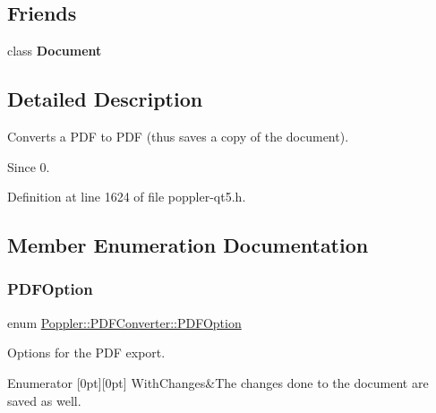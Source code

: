 \subsection*{Friends}
\begin{DoxyCompactItemize}
\item 
\mbox{\label{class_poppler_1_1_p_d_f_converter_a883538034e58fc5c0de7d4e4cab3cef7}} 
class {\bfseries Document}
\end{DoxyCompactItemize}


\subsection{Detailed Description}
Converts a P\+DF to P\+DF (thus saves a copy of the document).

\begin{DoxySince}{Since}
0. 
\end{DoxySince}


Definition at line 1624 of file poppler-\/qt5.\+h.



\subsection{Member Enumeration Documentation}
\mbox{\label{class_poppler_1_1_p_d_f_converter_a16b3fa4a594bdb7bfa09aaf40ed37f16}} 
\subsubsection{\texorpdfstring{P\+D\+F\+Option}{PDFOption}}
{\footnotesize\ttfamily enum \hyperlink{class_poppler_1_1_p_d_f_converter_a16b3fa4a594bdb7bfa09aaf40ed37f16}{Poppler\+::\+P\+D\+F\+Converter\+::\+P\+D\+F\+Option}}

Options for the P\+DF export. \begin{DoxyEnumFields}{Enumerator}
[0pt][0pt]{}\mbox{\label{class_poppler_1_1_p_d_f_converter_a16b3fa4a594bdb7bfa09aaf40ed37f16aefcb951a59ff05315133fb13af85d51b}} 
With\+Changes&The changes done to the document are saved as well. \\
\hline

\end{DoxyEnumFields}


